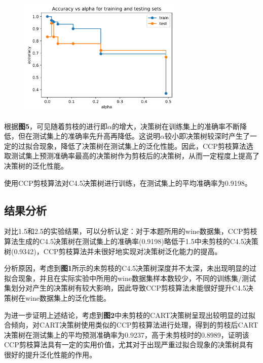 \documentclass[12pt]{article}
\begin{document}
\begin{figure}[h]
	\centering
	\includegraphics[width=0.7\textwidth]{3.png}
\end{figure}
\par
根据\textbf{图5}，可见随着剪枝的进行即$\alpha$的增大，决策树在训练集上的准确率不断降低，但在测试集上的准确率先升高再降低。这说明$\alpha$较小即决策树较深时产生了一定的过拟合现象，降低了决策树在测试集上的泛化性能。因此，CCP剪枝算法选取测试集上预测准确率最高的决策树作为剪枝后的决策树，从而一定程度上提高了决策树的泛化性能。\par 
使用CCP剪枝算法对C4.5决策树进行训练，在测试集上的平均准确率为0.9198。
\subsection{结果分析}
对比1.5和2.5的实验结果，可以分析认定：对于本题所用的wine数据集，CCP剪枝算法生成的C4.5决策树在测试集上的准确率(0.9198)略低于1.5中未剪枝的C4.5决策树(0.9342)，CCP剪枝算法并未很好地实现对决策树泛化能力的提高。\par 
分析原因，考虑到\textbf{图1}所示的未剪枝的C4.5决策树深度并不太深，未出现明显的过拟合现象，并且在实际实验中所用的wine数据集样本数较少，不同的训练集/测试集划分对产生的决策树有较大影响，因此导致CCP剪枝算法未能很好提升C4.5决策树在wine数据集上的泛化性能。\par 为进一步证明上述结论，考虑到\textbf{图2}中未剪枝的CART决策树呈现出较明显的过拟合倾向，对CART决策树使用类似的CCP剪枝算法进行处理，得到的剪枝后CART决策树在测试集上的平均预测准确率为0.9237，高于未剪枝时的0.8989，证明该CCP剪枝算法具有一定的实用价值，尤其对于出现严重过拟合现象的决策树具有很好的提升泛化性能的作用。

   

\vbox{}



\end{document}
